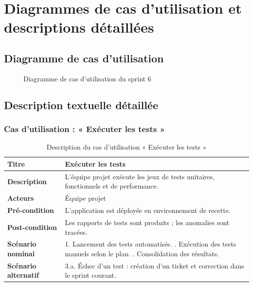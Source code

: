 \section{Diagrammes de cas d'utilisation et descriptions détaillées}

\subsection{Diagramme de cas d'utilisation}
\begin{figure}[h!]
\centering
{}
\caption{Diagramme de cas d'utilisation du sprint 6}
\end{figure}

\subsection{Description textuelle détaillée}

\subsubsection{Cas d'utilisation : « Exécuter les tests »}
\begin{table}[h!]
\centering
\renewcommand{\arraystretch}{1.3}
\begin{tabularx}{\textwidth}{|l|X|}
\hline
\textbf{Titre} & Exécuter les tests \\ \hline
\textbf{Description} & L'équipe projet exécute les jeux de tests unitaires,
fonctionnels et de performance. \\ \hline
\textbf{Acteurs} & Équipe projet \\ \hline
\textbf{Pré-condition} & L'application est déployée en environnement de recette. \\ \hline
\textbf{Post-condition} & Les rapports de tests sont produits ; les anomalies sont
tracées. \\ \hline
\textbf{Scénario nominal} &
1. Lancement des tests automatisés. \newline
2. Exécution des tests manuels selon le plan. \newline
3. Consolidation des résultats. \\ \hline
\textbf{Scénario alternatif} &
3.a. Échec d'un test : création d'un ticket et correction dans le sprint courant. \\ \hline
\end{tabularx}
\caption{Description du cas d'utilisation « Exécuter les tests »}
\end{table}

